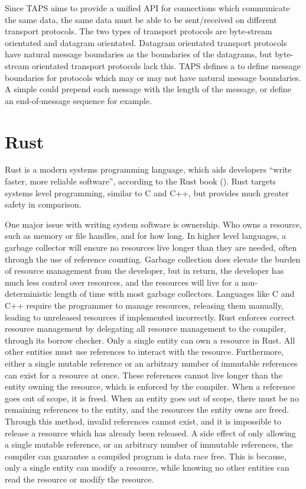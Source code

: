 Since TAPS aims to provide a unified API for connections which communicate the same data, the same data must be able to
be sent/received on different transport protocols.
The two types of transport protocols are byte-stream orientated and datagram orientated.
Datagram orientated transport protocols have natural message boundaries as the boundaries of the datagrams, but
byte-stream orientated transport protocols lack this.
TAPS defines a \framer{} to define message boundaries for protocols which may or may not have natural message
boundaries.
A simple \framer{} could prepend each message with the length of the message, or define an end-of-message sequence for
example.

\section{Rust}\label{sec:rust}
Rust is a modern systems programming language, which aids developers “write faster, more reliable software”, according
to the Rust book (\cite{kalbnik_rustprogramminglanguage_}).
Rust targets systems level programming, similar to C and C++, but provides much greater safety in comparison.

One major issue with writing system software is ownership.
Who owns a resource, such as memory or file handles, and for how long.
In higher level languages, a garbage collector will ensure no resources live longer than they are needed, often through
the use of reference counting.
Garbage collection does elevate the burden of resource management from the developer, but in return, the developer has
much less control over resources, and the resources will live for a non-deterministic length of time with most garbage
collectors.
Languages like C and C++ require the programmer to manage resources, releasing them manually, leading to unreleased
resources if implemented incorrectly.
Rust enforces correct resource management by delegating all resource management to the compiler, through its borrow
checker.
Only a single entity can own a resource in Rust.
All other entities must use references to interact with the resource.
Furthermore, either a single mutable reference or an arbitrary number of immutable references can exist for a resource
at once.
These references cannot live longer than the entity owning the resource, which is enforced by the compiler.
When a reference goes out of scope, it is freed.
When an entity goes out of scope, there must be no remaining references to the entity, and the resources the entity owns
are freed.
Through this method, invalid references cannot exist, and it is impossible to release a resource which has already been
released.
A side effect of only allowing a single mutable reference, or an arbitrary number of immutable references, the compiler
can guarantee a compiled program is data race free.
This is because, only a single entity can modify a resource, while knowing no other entities can read the resource or
modify the resource.

